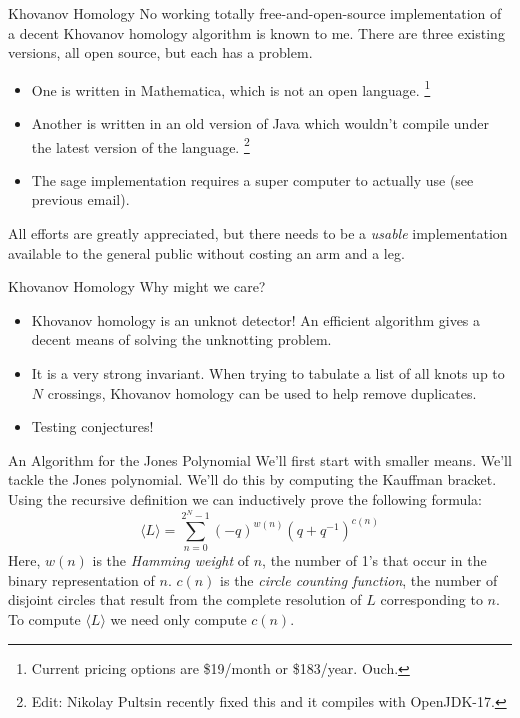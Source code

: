 \documentclass{beamer}
\begin{document}
    \begin{frame}{Khovanov Homology}
        No working totally free-and-open-source implementation of a decent
        Khovanov homology algorithm is known to me. There are three existing
        versions, all open source, but each has a problem.
        \begin{itemize}
            \item One is written in Mathematica, which is not an open language.%
                  \footnote{Current pricing options are \$19/month
                            or \$183/year. Ouch.}
            \item Another is written in an old version of Java which wouldn't
                  compile under the latest version of the language.%
                  \footnote{Edit: Nikolay Pultsin recently fixed this and it compiles with OpenJDK-17.}
            \item The sage implementation requires a super computer to actually
                  use (see previous email).
        \end{itemize}
        All efforts are greatly appreciated, but there needs to be a
        \textit{usable} implementation available to the general public without
        costing an arm and a leg.
    \end{frame}
    \begin{frame}{Khovanov Homology}
        Why might we care?
        \begin{itemize}
            \item Khovanov homology is an unknot detector!
                  An efficient algorithm gives a decent means of solving
                  the unknotting problem.
            \item It is a very strong invariant. When trying to tabulate a list
                  of all knots up to $N$ crossings, Khovanov homology can be
                  used to help remove duplicates.
            \item Testing conjectures!
        \end{itemize}
    \end{frame}
    \begin{frame}{An Algorithm for the Jones Polynomial}
        We'll first start with smaller means. We'll tackle the Jones
        polynomial. We'll do this by computing the Kauffman bracket. Using the
        recursive definition we can inductively prove the following formula:
        \begin{equation}
            \label{eqn:kauffman_bracket}%
            \langle{L}\rangle=\sum_{n=0}^{2^{N}-1}
                (-q)^{w(n)}(q+q^{-1})^{c(n)}
        \end{equation}
        Here, $w(n)$ is the \textit{Hamming weight} of $n$, the number of 1's
        that occur in the binary representation of $n$. $c(n)$ is the
        \textit{circle counting function}, the number of disjoint circles that
        result from the complete resolution of $L$ corresponding to $n$.
        To compute $\langle{L}\rangle$ we need only compute $c(n)$.
    \end{frame}
\end{document}
